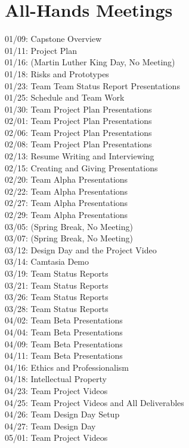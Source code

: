 \documentclass[11pt,a4paper,oneside]{article}
\begin{document}
\section{All-Hands Meetings}
01/09: Capstone Overview\\
01/11: Project Plan\\
01/16: (Martin Luther King Day, No Meeting)\\
01/18: Risks and Prototypes\\
01/23: Team Team Status Report Presentations\\
01/25: Schedule and Team Work\\
01/30: Team Project Plan Presentations\\
02/01: Team Project Plan Presentations\\
02/06: Team Project Plan Presentations\\
02/08: Team Project Plan Presentations\\
02/13: Resume Writing and Interviewing\\
02/15: Creating and Giving Presentations\\
02/20: Team Alpha Presentations\\
02/22: Team Alpha Presentations\\
02/27: Team Alpha Presentations\\
02/29: Team Alpha Presentations\\
03/05: (Spring Break, No Meeting)\\
03/07: (Spring Break, No Meeting)\\
03/12: Design Day and the Project Video\\
03/14: Camtasia Demo\\
03/19: Team Status Reports\\
03/21: Team Status Reports\\
03/26: Team Status Reports\\
03/28: Team Status Reports\\
04/02: Team Beta Presentations\\
04/04: Team Beta Presentations\\
04/09: Team Beta Presentations\\
04/11: Team Beta Presentations\\
04/16: Ethics and Professionalism\\
04/18: Intellectual Property\\
04/23: Team Project Videos\\
04/25: Team Project Videos and All Deliverables\\
04/26: Team Design Day Setup\\
04/27: Team Design Day\\
05/01: Team Project Videos\\
\end{document}
